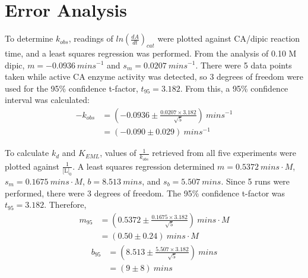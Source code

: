 \section{Error Analysis}
To determine $k_{obs}$, readings of $ln \left(\frac{dA}{dt}\right)_{cat}$ were plotted against CA/dipic reaction time, and a least squares regression was performed. From the analysis of 0.10 M dipic, $m=-0.0936{\ }{mins}^{-1}$ and $s_m=0.0207{\ }{mins}^{-1}$. There were 5 data points taken while active CA enzyme activity was detected, so 3 degrees of freedom were used for the 95\% confidence t-factor, $t_{95}=3.182$. From this, a 95\% confidence interval was calculated:
\begin{equation*}
\begin{split}
-k_{obs}&=\left (-0.0936\pm\frac{0.0207\times{3.182}}{\sqrt{5}}\right ){\ }{mins}^{-1}\\
&=\left (-0.090\pm0.029\right ){\ }{mins}^{-1}
\end{split}
\end{equation*}

To calculate $k_{d}$ and $K_{EML}$, values of $\frac{1}{k_{obs}}$ retrieved from all five experiments were plotted against $\frac{1}{\text{[L]}_0}$. A least squares regression determined $m=0.5372{\ }mins\cdot{M}$, $s_m=0.1675{\ }mins\cdot{M}$, $b=8.513{\ }{mins}$, and $s_b=5.507{\ }{mins}$. Since 5 runs were performed, there were 3 degrees of freedom. The 95\% confidence t-factor was $t_{95}=3.182$. Therefore,
\begin{equation}\label{eqn:err_analysis_m}
\begin{split}
m_{95}&=\left (0.5372\pm\frac{0.1675\times{3.182}}{\sqrt{5}}\right ){\ }mins\cdot{M}\\
&=\left (0.50\pm0.24\right ){\ }mins\cdot{M}
\end{split}
\end{equation}
\begin{equation}\label{eqn:err_analysis_b}
\begin{split}
b_{95}&=\left (8.513\pm\frac{5.507\times{3.182}}{\sqrt{5}}\right ){\ }{mins}\\
&=\left (9\pm8\right ){\ }{mins}
 \end{split}
\end{equation}

